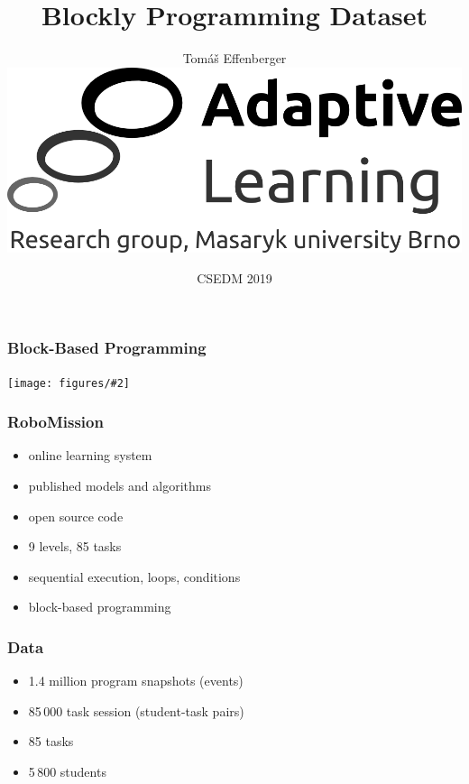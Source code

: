 \documentclass[bigger]{beamer}
\title{Blockly Programming Dataset}
\author{Tom\'a\v{s} Effenberger\\[4mm]
\includegraphics[width=.3\linewidth]{al-logo}\\[6mm]
}
\date{CSEDM 2019}
\newcommand{\img}[2]{
  \begin{center}
    \texttt{[image: figures/\#2]}
  \end{center}
}
\begin{document}
\frame{\titlepage}

\begin{frame}
  \frametitle{Block-Based Programming}



  \img{0.6}{robomission-on-yellow-to-left}

\end{frame}


\begin{frame}
  \frametitle{RoboMission}

  \begin{itemize}
  \item online learning system  %
  \item published models and algorithms  %
  \item open source code %
  \item 9 levels, 85 tasks  %
  \item sequential execution, loops, conditions
  \item block-based programming
  \end{itemize}
\end{frame}


\begin{frame}
  \frametitle{Data}


  \begin{itemize}
  \item 1.4 million program snapshots  (events) %
  \item 85\,000 task session (student-task pairs)
  \item 85 tasks
  \item 5\,800 students
  \end{itemize}

\end{frame}
\end{document}
